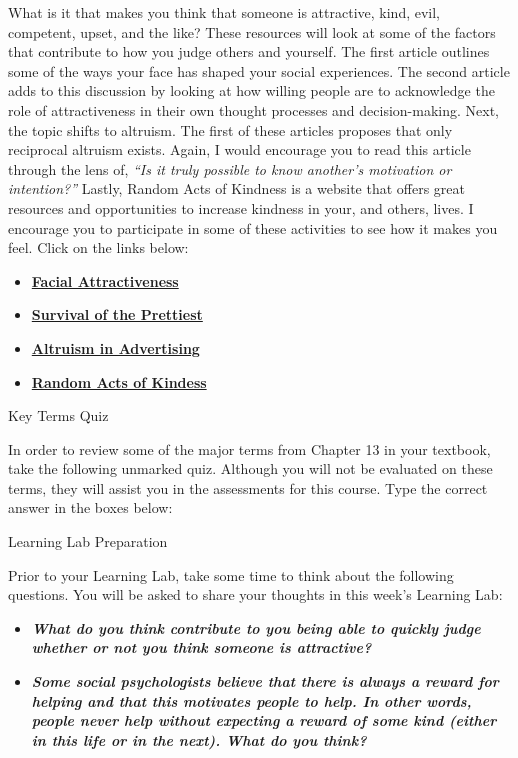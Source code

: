 \documentclass[
]{book}
\providecommand{\tightlist}{%
  \setlength{\itemsep}{0pt}\setlength{\parskip}{0pt}}
\begin{document}
\begin{reflect}
What is it that makes you think that someone is attractive, kind, evil, competent, upset, and the like? These resources will look at some of the factors that contribute to how you judge others and yourself. The first article outlines some of the ways your face has shaped your social experiences. The second article adds to this discussion by looking at how willing people are to acknowledge the role of attractiveness in their own thought processes and decision-making. Next, the topic shifts to altruism. The first of these articles proposes that only reciprocal altruism exists. Again, I would encourage you to read this article through the lens of, \emph{``Is it truly possible to know another's motivation or intention?''} Lastly, Random Acts of Kindness is a website that offers great resources and opportunities to increase kindness in your, and others, lives. I encourage you to participate in some of these activities to see how it makes you feel. Click on the links below:

\begin{itemize}
\tightlist
\item
  \href{https://www.ncbi.nlm.nih.gov/pmc/articles/PMC3130383/}{\textbf{Facial Attractiveness}}\\
\item
  \href{https://www.macleans.ca/society/science/the-mysterious-power-of-attractive-people/}{\textbf{Survival of the Prettiest}}\\
\item
  \href{https://public.wsu.edu/~taflinge/altruism.html}{\textbf{Altruism in Advertising}}\\
\item
  \href{http://www.actsofkindness.org/}{\textbf{Random Acts of Kindess}}
\end{itemize}

{Key Terms Quiz}

In order to review some of the major terms from Chapter 13 in your textbook, take the following unmarked quiz. Although you will not be evaluated on these terms, they will assist you in the assessments for this course. Type the correct answer in the boxes below:

{Learning Lab Preparation}

Prior to your Learning Lab, take some time to think about the following questions. You will be asked to share your thoughts in this week's Learning Lab:

\begin{itemize}
\tightlist
\item
  \textbf{\emph{What do you think contribute to you being able to quickly judge whether or not you think someone is attractive?}}\\
\item
  \textbf{\emph{Some social psychologists believe that there is always a reward for helping and that this motivates people to help. In other words, people never help without expecting a reward of some kind (either in this life or in the next). What do you think?}}
\end{itemize}
\end{reflect}
\end{document}
